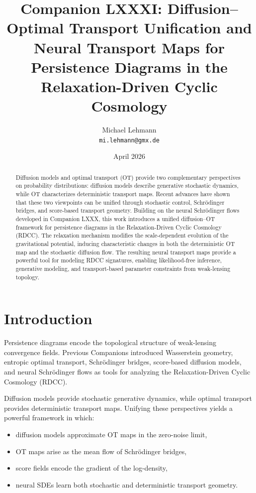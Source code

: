 \documentclass[11pt,a4paper]{article}
\title{\textbf{Companion LXXXI: Diffusion–Optimal Transport Unification and Neural Transport Maps for Persistence Diagrams in the Relaxation-Driven Cyclic Cosmology}}
\author{Michael Lehmann \\ \texttt{mi.lehmann@gmx.de}}
\date{April 2026}
\begin{document}
\maketitle

\begin{abstract}
Diffusion models and optimal transport (OT) provide two complementary perspectives 
on probability distributions: diffusion models describe generative stochastic 
dynamics, while OT characterizes deterministic transport maps. Recent advances 
have shown that these two viewpoints can be unified through stochastic control, 
Schrödinger bridges, and score-based transport geometry. Building on the neural 
Schrödinger flows developed in Companion LXXX, this work introduces a unified 
diffusion–OT framework for persistence diagrams in the Relaxation-Driven Cyclic 
Cosmology (RDCC). The relaxation mechanism modifies the scale-dependent evolution 
of the gravitational potential, inducing characteristic changes in both the 
deterministic OT map and the stochastic diffusion flow. The resulting neural 
transport maps provide a powerful tool for modeling RDCC signatures, enabling 
likelihood-free inference, generative modeling, and transport-based parameter 
constraints from weak-lensing topology.
\end{abstract}
\section{Introduction}

Persistence diagrams encode the topological structure of weak-lensing convergence 
fields. Previous Companions introduced Wasserstein geometry, entropic optimal 
transport, Schrödinger bridges, score-based diffusion models, and neural 
Schrödinger flows as tools for analyzing the Relaxation-Driven Cyclic Cosmology 
(RDCC).

Diffusion models provide stochastic generative dynamics, while optimal transport 
provides deterministic transport maps. Unifying these perspectives yields a 
powerful framework in which:

\begin{itemize}
    \item diffusion models approximate OT maps in the zero-noise limit,
    \item OT maps arise as the mean flow of Schrödinger bridges,
    \item score fields encode the gradient of the log-density,
    \item neural SDEs learn both stochastic and deterministic transport geometry.
\end{itemize}
\end{document}
